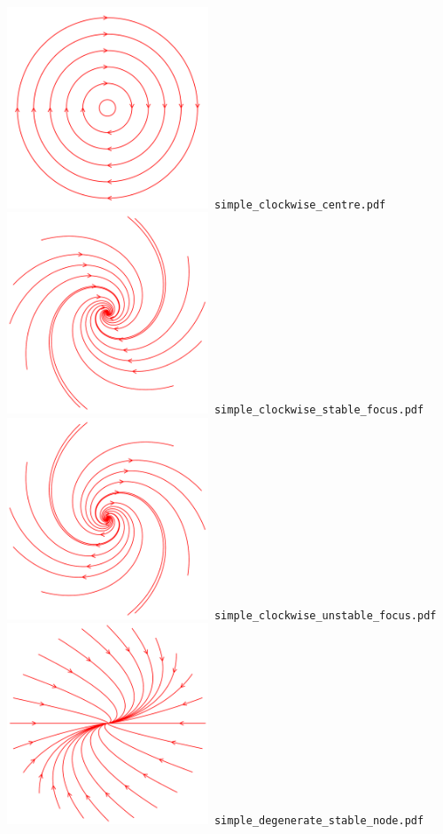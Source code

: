 \documentclass[a4paper]{amsart}
\begin{document}
\includegraphics[width=6cm]{simple_clockwise_centre.pdf}\verb+ simple_clockwise_centre.pdf+\\
\includegraphics[width=6cm]{simple_clockwise_stable_focus.pdf}\verb+ simple_clockwise_stable_focus.pdf+\\
\includegraphics[width=6cm]{simple_clockwise_unstable_focus.pdf}\verb+ simple_clockwise_unstable_focus.pdf+\\
\includegraphics[width=6cm]{simple_degenerate_stable_node.pdf}\verb+ simple_degenerate_stable_node.pdf+\\
\end{document}
